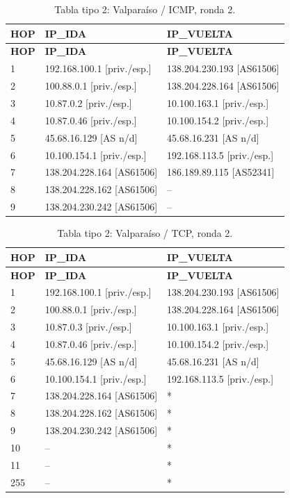 \endgroup
\begingroup
\fontsize{9}{11}\selectfont
\begin{longtable}{p{0.95cm}p{7.075cm}p{7.075cm}}
\caption{Tabla tipo 2: Valparaíso / ICMP, ronda 2.}\label{tabla2:138.204.230.242:ICMP} \\
\toprule
\textbf{HOP} & \textbf{IP\_\allowbreak{}IDA} & \textbf{IP\_\allowbreak{}VUELTA} \\ \midrule
\endfirsthead
\toprule
\textbf{HOP} & \textbf{IP\_\allowbreak{}IDA} & \textbf{IP\_\allowbreak{}VUELTA} \\ \midrule
\endhead
1 & 192.168.100.1 [priv./esp.] & 138.204.230.193 [AS61506] \\
2 & 100.88.0.1 [priv./esp.] & 138.204.228.164 [AS61506] \\
3 & 10.87.0.2 [priv./esp.] & 10.100.163.1 [priv./esp.] \\
4 & 10.87.0.46 [priv./esp.] & 10.100.154.2 [priv./esp.] \\
5 & 45.68.16.129 [AS n/d] & 45.68.16.231 [AS n/d] \\
6 & 10.100.154.1 [priv./esp.] & 192.168.113.5 [priv./esp.] \\
7 & 138.204.228.164 [AS61506] & 186.189.89.115 [AS52341] \\
8 & 138.204.228.162 [AS61506] & -- \\
9 & 138.204.230.242 [AS61506] & -- \\
\bottomrule
\end{longtable}
\endgroup
\begingroup
\fontsize{9}{11}\selectfont
\begin{longtable}{p{0.95cm}p{7.075cm}p{7.075cm}}
\caption{Tabla tipo 2: Valparaíso / TCP, ronda 2.}\label{tabla2:138.204.230.242:TCP} \\
\toprule
\textbf{HOP} & \textbf{IP\_\allowbreak{}IDA} & \textbf{IP\_\allowbreak{}VUELTA} \\ \midrule
\endfirsthead
\toprule
\textbf{HOP} & \textbf{IP\_\allowbreak{}IDA} & \textbf{IP\_\allowbreak{}VUELTA} \\ \midrule
\endhead
1 & 192.168.100.1 [priv./esp.] & 138.204.230.193 [AS61506] \\
2 & 100.88.0.1 [priv./esp.] & 138.204.228.164 [AS61506] \\
3 & 10.87.0.3 [priv./esp.] & 10.100.163.1 [priv./esp.] \\
4 & 10.87.0.46 [priv./esp.] & 10.100.154.2 [priv./esp.] \\
5 & 45.68.16.129 [AS n/d] & 45.68.16.231 [AS n/d] \\
6 & 10.100.154.1 [priv./esp.] & 192.168.113.5 [priv./esp.] \\
7 & 138.204.228.164 [AS61506] & * \\
8 & 138.204.228.162 [AS61506] & * \\
9 & 138.204.230.242 [AS61506] & * \\
10 & -- & * \\
11 & -- & * \\
255 & -- & * \\
\bottomrule
\end{longtable}
\endgroup

